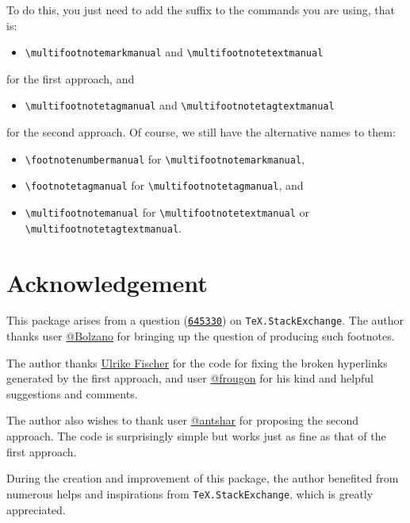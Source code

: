 \documentclass[classical]{einfart}
\begin{document}
To do this, you just need to add the suffix  to the commands you are using, that is:
\begin{itemize}
    \item \lstinline|\multifootnotemarkmanual| and \lstinline|\multifootnotetextmanual|
\end{itemize}
for the first approach, and
\begin{itemize}
    \item \lstinline|\multifootnotetagmanual| and \lstinline|\multifootnotetagtextmanual|
\end{itemize}
for the second approach. Of course, we still have the alternative names to them:
\begin{itemize}
    \item \lstinline|\footnotenumbermanual| for \lstinline|\multifootnotemarkmanual|,
    \item \lstinline|\footnotetagmanual| for \lstinline|\multifootnotetagmanual|, and
    \item \lstinline|\multifootnotemanual| for \lstinline|\multifootnotetextmanual| or \lstinline|\multifootnotetagtextmanual|.
\end{itemize}


\section{Acknowledgement}

This package arises from a question (\href{https://tex.stackexchange.com/q/645330}{\texttt{645330}}) on \texttt{TeX.StackExchange}. The author thanks user \href{https://tex.stackexchange.com/users/270985}{\textsf{@Bolzano}} for bringing up the question of producing such footnotes.

The author thanks \href{https://tex.stackexchange.com/users/2388}{\textsf{Ulrike Fischer}} for the code for fixing the broken hyperlinks generated by the first approach, and user \href{https://tex.stackexchange.com/users/73317}{\textsf{@frougon}} for his kind and helpful suggestions and comments.

The author also wishes to thank user \href{https://tex.stackexchange.com/users/213149}{\textsf{@antshar}} for proposing the second approach. The code is surprisingly simple but works just as fine as that of the first approach.

During the creation and improvement of this package, the author benefited from numerous helps and inspirations from \texttt{TeX.StackExchange}, which is greatly appreciated.
\end{document}
